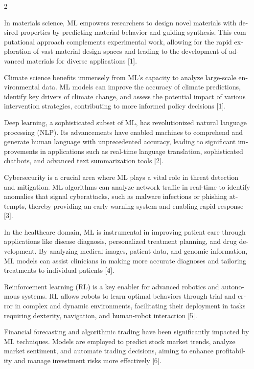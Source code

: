 \documentclass[a4paper,10pt,twoside]{article}
\begin{document}
\begin{multicols}{2}
\begin{otherlanguage}{english}
In materials science, ML empowers researchers to design novel materials with desired properties by predicting material behavior and guiding synthesis. This computational approach complements experimental work, allowing for the rapid exploration of vast material design spaces and leading to the development of advanced materials for diverse applications [1].

Climate science benefits immensely from ML's capacity to analyze large-scale environmental data. ML models can improve the accuracy of climate predictions, identify key drivers of climate change, and assess the potential impact of various intervention strategies, contributing to more informed policy decisions [1].

Deep learning, a sophisticated subset of ML, has revolutionized natural language processing (NLP). Its advancements have enabled machines to comprehend and generate human language with unprecedented accuracy, leading to significant improvements in applications such as real-time language translation, sophisticated chatbots, and advanced text summarization tools [2].

Cybersecurity is a crucial area where ML plays a vital role in threat detection and mitigation. ML algorithms can analyze network traffic in real-time to identify anomalies that signal cyberattacks, such as malware infections or phishing attempts, thereby providing an early warning system and enabling rapid response [3].

In the healthcare domain, ML is instrumental in improving patient care through applications like disease diagnosis, personalized treatment planning, and drug development. By analyzing medical images, patient data, and genomic information, ML models can assist clinicians in making more accurate diagnoses and tailoring treatments to individual patients [4].

Reinforcement learning (RL) is a key enabler for advanced robotics and autonomous systems. RL allows robots to learn optimal behaviors through trial and error in complex and dynamic environments, facilitating their deployment in tasks requiring dexterity, navigation, and human-robot interaction [5].

Financial forecasting and algorithmic trading have been significantly impacted by ML techniques. Models are employed to predict stock market trends, analyze market sentiment, and automate trading decisions, aiming to enhance profitability and manage investment risks more effectively [6].


\end{otherlanguage}
\end{multicols}
\end{document}
